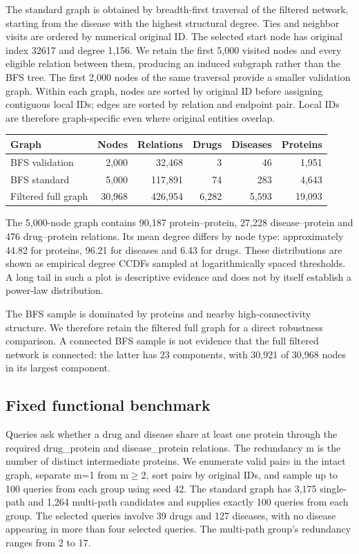 The standard graph is obtained by breadth-first traversal of the
filtered network, starting from the disease with the highest structural
degree. Ties and neighbor visits are ordered by numerical original ID.
The selected start node has original index 32617 and degree 1,156. We
retain the first 5,000 visited nodes and every eligible relation between
them, producing an induced subgraph rather than the BFS tree. The first
2,000 nodes of the same traversal provide a smaller validation graph.
Within each graph, nodes are sorted by original ID before assigning
contiguous local IDs; edges are sorted by relation and endpoint pair.
Local IDs are therefore graph-specific even where original entities
overlap.

\begin{longtable}[]{@{}lrrrrr@{}}
\toprule\noalign{}
Graph & Nodes & Relations & Drugs & Diseases & Proteins \\
\midrule\noalign{}
\endhead
\bottomrule\noalign{}
\endlastfoot
BFS validation & 2,000 & 32,468 & 3 & 46 & 1,951 \\
BFS standard & 5,000 & 117,891 & 74 & 283 & 4,643 \\
Filtered full graph & 30,968 & 426,954 & 6,282 & 5,593 & 19,093 \\
\end{longtable}

The 5,000-node graph contains 90,187 protein--protein, 27,228
disease--protein and 476 drug--protein relations. Its mean degree
differs by node type: approximately 44.82 for proteins, 96.21 for
diseases and 6.43 for drugs. These distributions are shown as empirical
degree CCDFs sampled at logarithmically spaced thresholds. A long tail
in such a plot is descriptive evidence and does not by itself establish
a power-law distribution.

The BFS sample is dominated by proteins and nearby high-connectivity
structure. We therefore retain the filtered full graph for a direct
robustness comparison. A connected BFS sample is not evidence that the
full filtered network is connected: the latter has 23 components, with
30,921 of 30,968 nodes in its largest component.

\subsection{Fixed functional
benchmark}\label{fixed-functional-benchmark}

Queries ask whether a drug and disease share at least one protein
through the required drug\_protein and disease\_protein relations. The
redundancy m is the number of distinct intermediate proteins. We
enumerate valid pairs in the intact graph, separate m=1 from m$\geq$2, sort
pairs by original IDs, and sample up to 100 queries from each group
using seed 42. The standard graph has 3,175 single-path and 1,264
multi-path candidates and supplies exactly 100 queries from each group.
The selected queries involve 39 drugs and 127 diseases, with no disease
appearing in more than four selected queries. The multi-path group's
redundancy ranges from 2 to 17.

